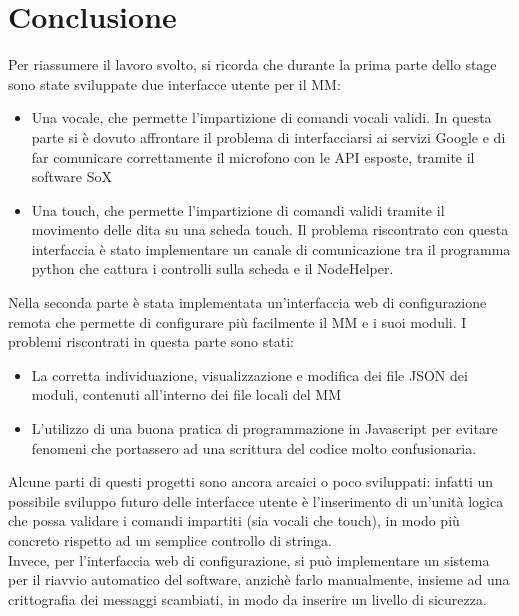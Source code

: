 \chapter*{Conclusione}

Per riassumere il lavoro svolto, si ricorda che durante la prima parte dello stage sono state sviluppate due interfacce utente per il MM:
\begin{itemize}
\item Una vocale, che permette l'impartizione di comandi vocali validi. In questa parte si \`e dovuto affrontare il problema di interfacciarsi
ai servizi Google e di far comunicare correttamente il microfono con le API esposte, tramite il software SoX
\item Una touch, che permette l'impartizione di comandi validi tramite il movimento delle dita su una scheda touch.
Il problema riscontrato con questa interfaccia \`e stato implementare un canale di comunicazione tra il programma python che cattura i controlli
sulla scheda e il NodeHelper.
\end{itemize}
Nella seconda parte \`e stata implementata un'interfaccia web di configurazione remota
che permette di configurare pi\`u facilmente il MM e i suoi moduli.
I problemi riscontrati in questa parte sono stati:
\begin{itemize}
\item La corretta individuazione, visualizzazione e modifica dei file JSON
dei moduli, contenuti all'interno dei file locali del MM
\item L'utilizzo di una buona pratica di programmazione in Javascript per evitare fenomeni
che portassero ad una scrittura del codice molto confusionaria.\\[1\baselineskip]
\end{itemize}
Alcune parti di questi progetti sono ancora arcaici o poco sviluppati:
infatti un possibile sviluppo futuro delle interfacce utente \`e l'inserimento di un'unit\`a logica che possa validare i comandi
impartiti (sia vocali che touch), in modo pi\`u concreto rispetto ad un semplice  controllo di stringa.\\
Invece, per l'interfaccia web di configurazione, si pu\`o implementare un sistema per il riavvio automatico del software,
anzich\`e farlo manualmente, insieme ad una crittografia dei messaggi scambiati, in modo da inserire un livello di sicurezza.
